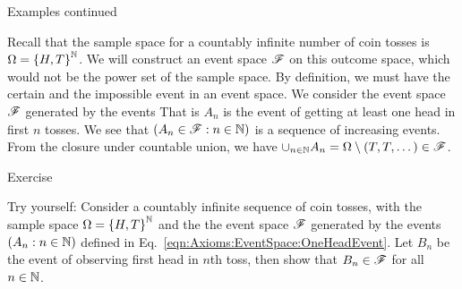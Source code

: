 \documentclass[12pt,aspectratio=169]{beamer}
\begin{document}
\begin{frame}{Examples continued}
    \begin{Example} 
        Recall that the sample space for a countably infinite number of coin tosses is $\Omega = \left\{H, T\right\}^{\mathbb{N}}$.  
        We will construct an event space $\mathscr{F}$ on this outcome space, which would not be the power set of the sample space. 
        By definition, we must have the certain and the impossible event in an event space.
        We consider the event space $\mathscr{F}$ generated by the events 
        That is $A_n$ is the event of getting at least one head in first $n$ tosses. 
        We see that $(A_n \in \mathscr{F}: n \in \mathbb{N})$ is a sequence of increasing events.  
        From the closure under countable union, we have $\cup_{n \in \mathbb{N}}A_n = \Omega\setminus(T, T, \dots) \in \mathscr{F}$. 
    \end{Example}
\end{frame}


\begin{frame}{Exercise}
    \begin{block}{Try yourself:}
        Consider a countably infinite sequence of coin tosses, with the sample space $\Omega = \left\{H,T\right\}^{\mathbb{N}}$ and the the event space $\mathscr{F}$ generated by the events $(A_n: n \in \mathbb{N})$ defined in Eq.~\eqref{eqn:Axioms:EventSpace:OneHeadEvent}. 
        Let $B_n$ be the event of observing first head in $n$th toss, 
        then show that $B_n \in \mathscr{F}$ for all $ n \in \mathbb{N}$.  
    \end{block}
\end{frame}

\end{document}

